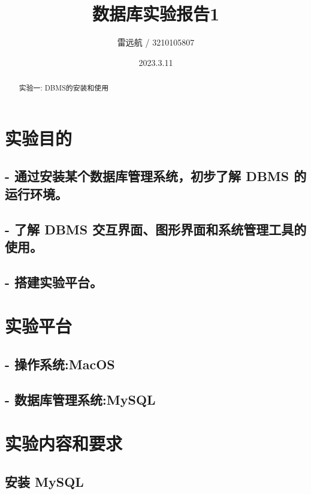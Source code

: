 \documentclass{article}
\title{数据库实验报告1}
\author{雷远航 / 3210105807}
\date{2023.3.11}
\begin{document}


\maketitle


\begin{abstract}
    实验一: DBMS的安装和使用
\end{abstract}






\section{实验目的}

\subsection*{- 通过安装某个数据库管理系统，初步了解 DBMS 的运行环境。}


\subsection*{- 了解 DBMS 交互界面、图形界面和系统管理工具的使用。}




\subsection*{- 搭建实验平台。}


\section{实验平台}
\subsection*{- 操作系统:MacOS}
\subsection*{- 数据库管理系统:MySQL}

\section{实验内容和要求}

\subsection{安装 MySQL }
\end{document}
